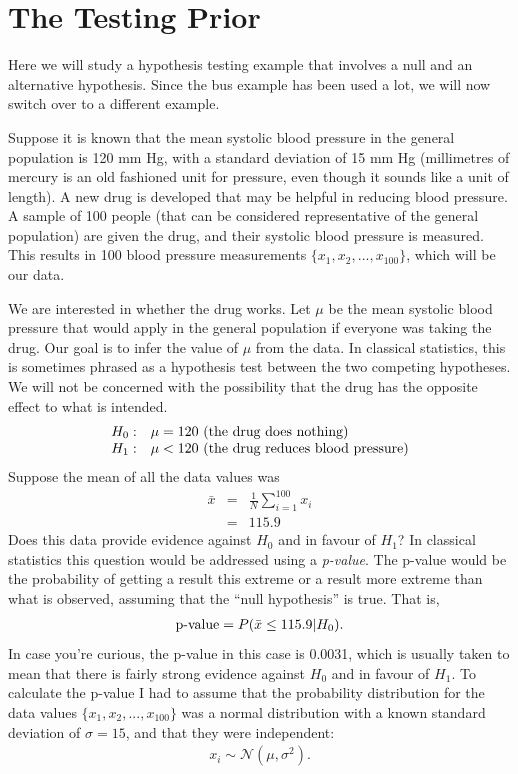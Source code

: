 \section{The Testing Prior}
Here we will study a hypothesis testing example that involves a null and an
alternative hypothesis. Since the bus example has been used a lot, we will now
switch over to a different example.

Suppose it is known that the mean systolic blood pressure
in the general population is 120 mm Hg, with a standard deviation of
15 mm Hg (millimetres of mercury is an
old fashioned unit for pressure, even though it sounds like a unit of length).
A new drug is developed that may
be helpful in reducing blood pressure. A sample of 100 people
(that can be considered representative of the general population)
are given the drug, and their systolic blood pressure is measured. This results
in 100 blood pressure measurements $\{x_1, x_2, ..., x_{100}\}$, which will be
our data.

We are interested in whether the drug works. Let $\mu$ be the mean systolic
blood pressure
that would apply in the general population if everyone was taking the
drug. Our goal is to infer the value of $\mu$ from the data. In classical
statistics, this is sometimes phrased as a hypothesis test between the two
competing hypotheses. We will not be concerned with the possibility that the
drug has the opposite effect to what is intended.
\begin{equation}
\begin{array}{ll}
H_0: & \mu = 120 \textnormal{ (the drug does nothing)}\\
H_1: & \mu < 120 \textnormal{ (the drug reduces blood pressure)}
\end{array}
\end{equation}
Suppose the mean of all the data values was
\begin{eqnarray}
\bar{x} &=& \frac{1}{N} \sum_{i=1}^{100} x_i\\
&=& 115.9
\end{eqnarray}
Does this data provide evidence against $H_0$ and in favour of $H_1$? In
classical statistics this question would be addressed using a {\it p-value}.
The p-value would be the probability of getting a result this extreme or
a result more extreme than what is observed, assuming that the ``null hypothesis''
is true. That is,
\begin{eqnarray}
\textnormal{p-value} = P(\bar{x} \leq 115.9 | H_0).
\end{eqnarray}
In case you're curious, the p-value in this case is 0.0031, which is usually
taken to mean that there is fairly strong evidence against $H_0$ and in favour
of $H_1$. To calculate the p-value I had to assume that the probability distribution
for the data values $\{x_1, x_2, ..., x_{100}\}$ was a normal distribution
with a known standard deviation of $\sigma=15$, and
that they were independent:
\begin{eqnarray}
x_i \sim \mathcal{N}(\mu, \sigma^2). \label{eq:normal}
\end{eqnarray}

